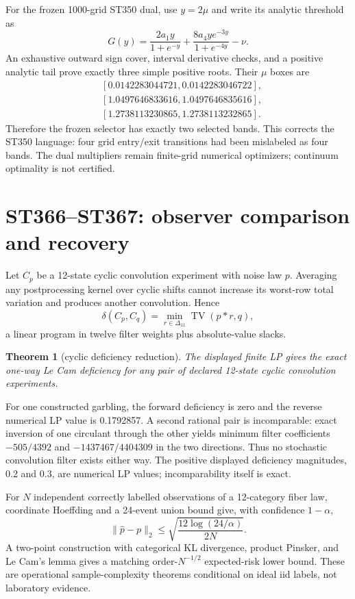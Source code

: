 \documentclass[11pt,a4paper]{article}
\newtheorem{theorem}{Theorem}[section]
\begin{document}
For the frozen 1000-grid ST350 dual, use $y=2\mu$ and write its analytic threshold as
\[
G(y)=\frac{2a_1y}{1+e^{-y}}
+\frac{8a_4ye^{-3y}}{1+e^{-4y}}-\nu.
\]
An exhaustive outward sign cover, interval derivative checks, and a positive analytic tail
prove exactly three simple positive roots. Their $\mu$ boxes are
\[
\begin{split}
&[0.0142283044721,0.0142283046722],\\
&[1.0497646833616,1.0497646835616],\\
&[1.2738113230865,1.2738113232865].
\end{split}
\]
Therefore the frozen selector has exactly two selected bands. This corrects the ST350
language: four grid entry/exit transitions had been mislabeled as four bands. The dual
multipliers remain finite-grid numerical optimizers; continuum optimality is not certified.

\section{ST366--ST367: observer comparison and recovery}

Let $C_p$ be a 12-state cyclic convolution experiment with noise law $p$. Averaging any
postprocessing kernel over cyclic shifts cannot increase its worst-row total variation and
produces another convolution. Hence
\[
\delta(C_p,C_q)=\min_{r\in\Delta_{11}}\operatorname{TV}(p*r,q),
\]
a linear program in twelve filter weights plus absolute-value slacks.

\begin{theorem}[cyclic deficiency reduction]
The displayed finite LP gives the exact one-way Le Cam deficiency for any pair of declared
12-state cyclic convolution experiments.
\end{theorem}

For one constructed garbling, the forward deficiency is zero and the reverse numerical LP
value is 0.1792857. A second rational pair is incomparable: exact inversion of one
circulant through the other yields minimum filter coefficients $-505/4392$ and
$-1437467/4404309$ in the two directions. Thus no stochastic convolution filter exists
either way. The positive displayed deficiency magnitudes, 0.2 and 0.3, are numerical LP
values; incomparability itself is exact.

For $N$ independent correctly labelled observations of a 12-category fiber law, coordinate
Hoeffding and a 24-event union bound give, with confidence $1-\alpha$,
\[
\|\widehat p-p\|_2\leq
\sqrt{\frac{12\log(24/\alpha)}{2N}}.
\]
A two-point construction with categorical KL divergence, product Pinsker, and Le Cam's
lemma gives a matching order-$N^{-1/2}$ expected-risk lower bound. These are operational
sample-complexity theorems conditional on ideal iid labels, not laboratory evidence.
\end{document}
